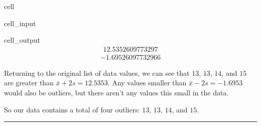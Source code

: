 \documentclass[letterpaper,10pt,english]{jupyterBook}
\begin{document}
\begin{sphinxuseclass}{cell}\begin{sphinxVerbatimInput}

\begin{sphinxuseclass}{cell_input}
\begin{sphinxVerbatim}[commandchars=\\\{\}]
\end{sphinxVerbatim}

\end{sphinxuseclass}\end{sphinxVerbatimInput}
\begin{sphinxVerbatimOutput}

\begin{sphinxuseclass}{cell_output}\begin{equation*}
\begin{split}12.5352609773297\end{split}
\end{equation*}\begin{equation*}
\begin{split}-1.69526097732966\end{split}
\end{equation*}
\end{sphinxuseclass}\end{sphinxVerbatimOutput}

\end{sphinxuseclass}
\sphinxAtStartPar
Returning to the original list of data values, we can see that \(13\), \(13\), \(14\), and \(15\) are greater than \(\bar{x} + 2s = 12.5353\). Any values smaller than \(\bar{x} - 2s = -1.6953\) would also be outliers, but there aren’t any values this small in the data.

\sphinxAtStartPar
So our data contains a total of four outliers: \(13\), \(13\), \(14\), and \(15\).


\bigskip\hrule\bigskip


\sphinxstepscope
\end{document}
